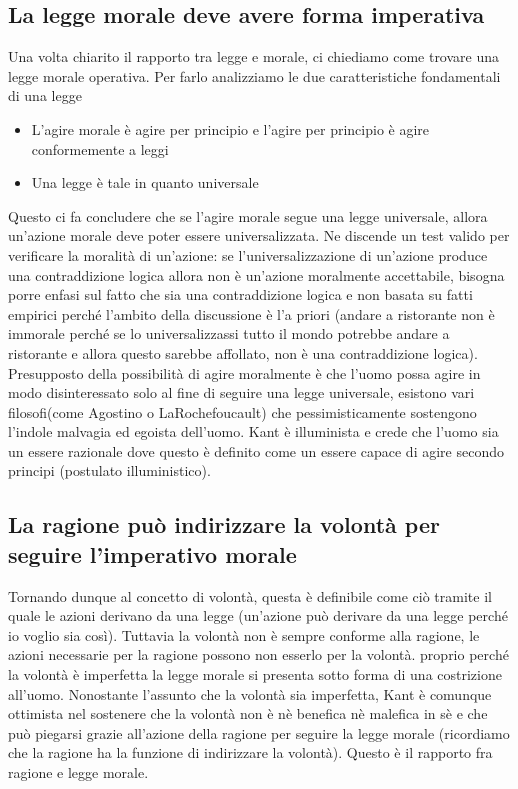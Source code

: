 \documentclass[10pt,a4paper]{article}
\begin{document}
\subsection{La legge morale deve avere forma imperativa}
Una volta chiarito il rapporto tra legge e morale, ci chiediamo come trovare una legge morale operativa. Per farlo analizziamo le due caratteristiche fondamentali di una legge
\begin{itemize}
	\item L'agire morale è agire per principio e l'agire per principio è agire conformemente a leggi
	\item Una legge è tale in quanto universale
\end{itemize}
Questo ci fa concludere che se l'agire morale segue una legge universale, allora un'azione morale deve poter essere universalizzata. Ne discende un test valido per verificare la moralità di un'azione: se l'universalizzazione di un'azione produce una contraddizione logica allora non è un'azione moralmente accettabile, bisogna porre enfasi sul fatto che sia una contraddizione logica e non basata su fatti empirici perché l'ambito della discussione è l'a priori (andare a ristorante non è immorale perché se lo universalizzassi tutto il mondo potrebbe andare a ristorante e allora questo sarebbe affollato, non è una contraddizione logica).\\
Presupposto della possibilità di agire moralmente è che l'uomo possa agire in modo disinteressato solo al fine di seguire una legge universale, esistono vari filosofi(come Agostino o LaRochefoucault) che pessimisticamente sostengono l'indole malvagia ed egoista dell'uomo. Kant è illuminista e crede che l'uomo sia un essere razionale dove questo è definito come un essere capace di agire secondo principi (postulato illuministico).
\subsection{La ragione può indirizzare la volontà per seguire l'imperativo morale}
Tornando dunque al concetto di volontà, questa è definibile come ciò tramite il quale le azioni derivano da una legge (un'azione può derivare da una legge perché io voglio sia così). Tuttavia la volontà non è sempre conforme alla ragione, le azioni necessarie per la ragione possono non esserlo per la volontà. proprio perché la volontà è imperfetta la legge morale si presenta sotto forma di una costrizione all'uomo. Nonostante l'assunto che la volontà sia imperfetta, Kant è comunque ottimista nel sostenere che la volontà non è nè benefica nè malefica in sè e che può piegarsi grazie all'azione della ragione per seguire la legge morale (ricordiamo che la ragione ha la funzione di indirizzare la volontà). Questo è il rapporto fra ragione e legge morale.
\end{document}
